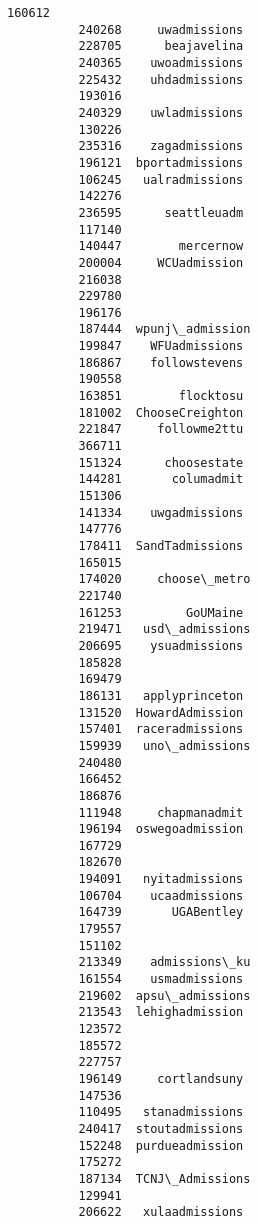 \documentclass[11pt]{article}
\begin{document}
\begin{Verbatim}[commandchars=\\\{\}]
          160612                   
          240268     uwadmissions  
          228705      beajavelina  
          240365    uwoadmissions  
          225432    uhdadmissions  
          193016                   
          240329    uwladmissions  
          130226                   
          235316    zagadmissions  
          196121  bportadmissions  
          106245   ualradmissions  
          142276                   
          236595      seattleuadm  
          117140                   
          140447        mercernow  
          200004     WCUadmission  
          216038                   
          229780                   
          196176                   
          187444  wpunj\_admission  
          199847    WFUadmissions  
          186867    followstevens  
          190558                   
          163851        flocktosu  
          181002  ChooseCreighton  
          221847     followme2ttu  
          366711                   
          151324      choosestate  
          144281       columadmit  
          151306                   
          141334    uwgadmissions  
          147776                   
          178411  SandTadmissions  
          165015                   
          174020     choose\_metro  
          221740                   
          161253         GoUMaine  
          219471   usd\_admissions  
          206695    ysuadmissions  
          185828                   
          169479                   
          186131   applyprinceton  
          131520  HowardAdmission  
          157401  raceradmissions  
          159939   uno\_admissions  
          240480                   
          166452                   
          186876                   
          111948     chapmanadmit  
          196194  oswegoadmission  
          167729                   
          182670                   
          194091   nyitadmissions  
          106704    ucaadmissions  
          164739       UGABentley  
          179557                   
          151102                   
          213349    admissions\_ku  
          161554    usmadmissions  
          219602  apsu\_admissions  
          213543  lehighadmission  
          123572                   
          185572                   
          227757                   
          196149     cortlandsuny  
          147536                   
          110495   stanadmissions  
          240417  stoutadmissions  
          152248  purdueadmission  
          175272                   
          187134  TCNJ\_Admissions  
          129941                   
          206622   xulaadmissions  

\end{Verbatim}
\end{document}
